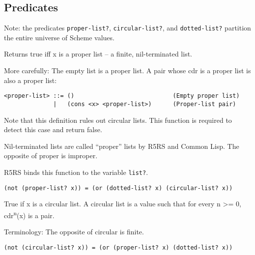\subsection{{Predicates}}

Note: the predicates \texttt{proper-list?}, \texttt{circular-list?}, and
\texttt{dotted-list?} partition the entire universe of Scheme values.

  \begin{entry}{%
    }
    Returns
    true iff x is a proper list -- a finite, nil-terminated list.


    More carefully: The empty list is a proper list. A pair whose cdr
    is a proper list is also a proper list:

\begin{verbatim}
<proper-list> ::= ()                            (Empty proper list)
              |   (cons <x> <proper-list>)      (Proper-list pair)
\end{verbatim}

    Note that this definition rules out circular lists. This function
    is required to detect this case and return false.

    Nil-terminated lists are called ``proper'' lists by R5RS and
    Common Lisp. The opposite of proper is improper.

    R5RS binds this function to the variable
    \texttt{list?}.
    
\begin{verbatim}
(not (proper-list? x)) = (or (dotted-list? x) (circular-list? x))
\end{verbatim}
 

  \end{entry}

  \begin{entry}{%
      } 
 
    True if x
    is a circular list. A circular list is a value such that for every
    n \textgreater{}= 0, cdr\textsuperscript{n}(x) is a pair.

    Terminology: The opposite of circular is finite.

\begin{verbatim}
(not (circular-list? x)) = (or (proper-list? x) (dotted-list? x))
\end{verbatim}
  \end{entry}

